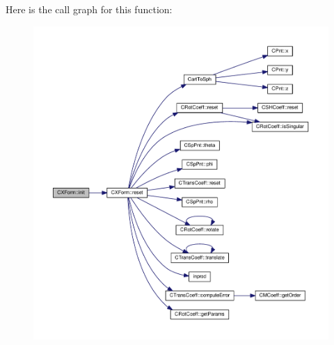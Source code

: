 Here is the call graph for this function\-:
\nopagebreak
\begin{figure}[H]
\begin{center}
\leavevmode
\includegraphics[width=350pt]{classCXForm_a9fe5afbc751e5d8a8d48aa20471c84a5_cgraph}
\end{center}
\end{figure}


